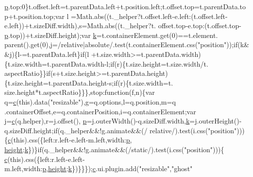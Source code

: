 \begin{DoxyCode}
      \hyperlink{jquery_8js_a2335e57f79b6acfb6de59c235dc8a83e}{p}.top:0\}t.offset.left=t.parentData.left+t.position.left;t.offset.top=t.parentData.top+t.position.top;var l
      =Math.abs((t.\_helper?t.offset.left-e.left:(t.offset.left-e.left))+t.sizeDiff.width),s=Math.abs((t.\_helper?t.
      offset.top-e.top:(t.offset.top-\hyperlink{jquery_8js_a2335e57f79b6acfb6de59c235dc8a83e}{p}.top))+t.sizeDiff.height);var \hyperlink{jquery_8js_ab26645c014aa005ecedef329ecf58c99}{k}=t.containerElement.get(0)==t.element.
      parent().get(0),j=/relative|absolute/.test(t.containerElement.css(\textcolor{stringliteral}{"position"}));\textcolor{keywordflow}{if}(k&&j)\{l-=t.parentData.left\}\textcolor{keywordflow}{if}(l
      +t.size.width>=t.parentData.width)\{t.size.width=t.parentData.width-l;\textcolor{keywordflow}{if}(r)\{t.size.height=t.size.width/t.
      aspectRatio\}\}\textcolor{keywordflow}{if}(s+t.size.height>=t.parentData.height)\{t.size.height=t.parentData.height-s;\textcolor{keywordflow}{if}(r)\{t.size.width=t.
      size.height*t.aspectRatio\}\}\},stop:\textcolor{keyword}{function}(f,n)\{var q=\hyperlink{jquery_8js_ad171626e81625b5e9f5cb177a3a8fb1c}{c}(\textcolor{keyword}{this}).data(\textcolor{stringliteral}{"resizable"}),g=q.options,l=q.position,m=q
      .containerOffset,e=q.containerPosition,i=q.containerElement;var j=\hyperlink{jquery_8js_ad171626e81625b5e9f5cb177a3a8fb1c}{c}(q.helper),r=j.offset(),
      \hyperlink{jquery_8js_a2335e57f79b6acfb6de59c235dc8a83e}{p}=j.outerWidth()-q.sizeDiff.width,\hyperlink{jquery_8js_ab26645c014aa005ecedef329ecf58c99}{k}=j.outerHeight()-q.sizeDiff.height;\textcolor{keywordflow}{if}(q.\_helper&&!g.animate&&(/
      relative/).test(i.css(\textcolor{stringliteral}{"position"})))\{\hyperlink{jquery_8js_ad171626e81625b5e9f5cb177a3a8fb1c}{c}(\textcolor{keyword}{this}).css(\{left:r.left-e.left-m.left,width:\hyperlink{jquery_8js_a2335e57f79b6acfb6de59c235dc8a83e}{p},
      \hyperlink{styr_2styr_2main_8c_a48083b65ac9a863566dc3e3fff09a5b4}{height}:\hyperlink{jquery_8js_ab26645c014aa005ecedef329ecf58c99}{k}\})\}\textcolor{keywordflow}{if}(q.\_helper&&!g.animate&&(/\textcolor{keyword}{static}/).test(i.css(\textcolor{stringliteral}{"position"})))\{
      \hyperlink{jquery_8js_ad171626e81625b5e9f5cb177a3a8fb1c}{c}(\textcolor{keyword}{this}).css(\{left:r.left-e.left-m.left,width:\hyperlink{jquery_8js_a2335e57f79b6acfb6de59c235dc8a83e}{p},\hyperlink{styr_2styr_2main_8c_a48083b65ac9a863566dc3e3fff09a5b4}{height}:\hyperlink{jquery_8js_ab26645c014aa005ecedef329ecf58c99}{k}\})\}\}\});\hyperlink{jquery_8js_ad171626e81625b5e9f5cb177a3a8fb1c}{c}.ui.plugin.add(\textcolor{stringliteral}{"resizable"},\textcolor{stringliteral}{"ghost"}

\end{DoxyCode}
